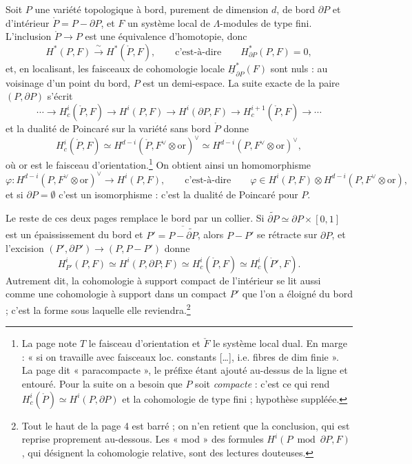 \documentclass[11pt,a4paper]{article}
\begin{document}
Soit $P$ une variété topologique à bord, purement de dimension $d$, de bord
$\partial P$ et d'intérieur $\mathring{P} = P - \partial P$, et $F$ un système
local de $\Lambda$-modules de type fini. L'inclusion $\mathring{P} \to P$ est
une équivalence d'homotopie, donc
\[
  H^{*}(P, F) \xrightarrow{\ \sim\ } H^{*}(\mathring{P}, F),
  \qquad \text{c'est-à-dire} \qquad H^{*}_{\partial P}(P, F) = 0,
\]
et, en localisant, les faisceaux de cohomologie locale
$\underline{H}^{*}_{\partial P}(F)$ sont nuls : au voisinage d'un point du
bord, $P$ est un demi-espace. La suite exacte de la paire $(P, \partial P)$
s'écrit
\[
  \cdots \to H^{i}_{c}(\mathring{P}, F) \to H^{i}(P, F) \to H^{i}(\partial P, F)
  \to H^{i+1}_{c}(\mathring{P}, F) \to \cdots
\]
et la dualité de Poincaré sur la variété sans bord $\mathring{P}$ donne
\[
  H^{i}_{c}(\mathring{P}, F) \simeq
  H^{d-i}(\mathring{P}, F^{\vee} \otimes \mathrm{or})^{\vee} \simeq
  H^{d-i}(P, F^{\vee} \otimes \mathrm{or})^{\vee},
\]
où $\mathrm{or}$ est le faisceau d'orientation.\footnote{La page note $T$ le
faisceau d'orientation et $\check{F}$ le système local dual. En marge : « si on
travaille avec faisceaux loc. constants […], i.e. fibres de dim finie ». La
page dit « paracompacte », le préfixe étant ajouté au-dessus de la ligne et
entouré. Pour la suite on a besoin que $P$ soit \emph{compacte} : c'est ce qui
rend $H^{i}_{c}(\mathring{P}) \simeq H^{i}(P, \partial P)$ et la cohomologie
de type fini ; hypothèse suppléée.} On obtient ainsi un homomorphisme
\[
  \varphi : H^{d-i}(P, F^{\vee} \otimes \mathrm{or})^{\vee} \longrightarrow H^{i}(P, F),
  \qquad \text{c'est-à-dire} \qquad
  \varphi \in H^{i}(P, F) \otimes H^{d-i}(P, F^{\vee} \otimes \mathrm{or}),
\]
et si $\partial P = \emptyset$ c'est un isomorphisme : c'est la dualité de
Poincaré pour $P$.

Le reste de ces deux pages remplace le bord par un collier. Si
$\widetilde{\partial P} \simeq \partial P \times [0, 1]$ est un épaississement
du bord et $P' = \overline{P - \widetilde{\partial P}}$, alors $P - P'$ se
rétracte sur $\partial P$, et l'excision $(P', \partial P') \to (P, P - P')$
donne
\[
  H^{i}_{P'}(P, F) \simeq H^{i}(P, \partial P; F) \simeq H^{i}_{c}(\mathring{P}, F)
  \simeq H^{i}_{c}(\mathring{P}', F).
\]
Autrement dit, la cohomologie à support compact de l'intérieur se lit aussi
comme une cohomologie à support dans un compact $P'$ que l'on a éloigné du
bord ; c'est la forme sous laquelle elle reviendra.\footnote{Tout le haut de
la page 4 est barré ; on n'en retient que la conclusion, qui est reprise
proprement au-dessous. Les « mod » des formules
$H^{i}(P \bmod \partial P, F)$, qui désignent la cohomologie relative, sont
des lectures douteuses.}
\end{document}
